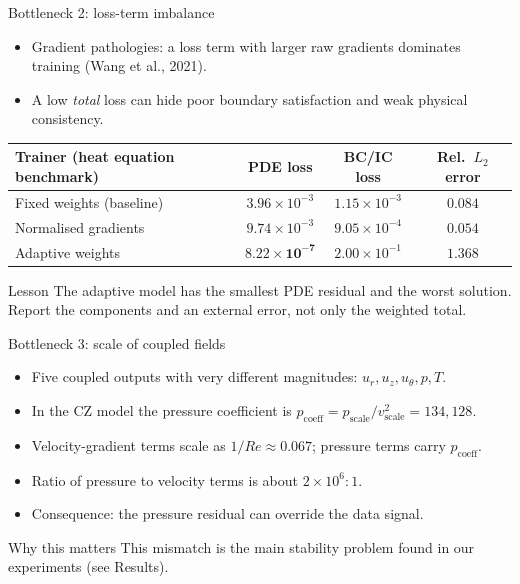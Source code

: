 \documentclass[aspectratio=169]{beamer}
\begin{document}
\begin{frame}{Bottleneck 2: loss-term imbalance}
\begin{itemize}
  \item Gradient pathologies: a loss term with larger raw gradients dominates training (Wang et al., 2021).
  \item A low \emph{total} loss can hide poor boundary satisfaction and weak physical consistency.
\end{itemize}
\vspace{0.2cm}
\begin{center}
\small
\begin{tabular}{lccc}
\toprule
Trainer (heat equation benchmark) & PDE loss & BC/IC loss & Rel.\ $L_2$ error \\
\midrule
Fixed weights (baseline) & $3.96\times10^{-3}$ & $1.15\times10^{-3}$ & $0.084$ \\
Normalised gradients & $9.74\times10^{-3}$ & $9.05\times10^{-4}$ & $0.054$ \\
Adaptive weights & $\mathbf{8.22\times10^{-7}}$ & $2.00\times10^{-1}$ & $\mathbf{1.368}$ \\
\bottomrule
\end{tabular}
\end{center}
\vspace{0.2cm}
\begin{block}{Lesson}
The adaptive model has the smallest PDE residual and the worst solution. Report the components and an external error, not only the weighted total.
\end{block}
\end{frame}

\begin{frame}{Bottleneck 3: scale of coupled fields}
\begin{itemize}
  \item Five coupled outputs with very different magnitudes: $u_r, u_z, u_\theta, p, T$.
  \item In the CZ model the pressure coefficient is $p_{\mathrm{coeff}} = p_{\mathrm{scale}}/v_{\mathrm{scale}}^2 = 134{,}128$.
  \item Velocity-gradient terms scale as $1/Re \approx 0.067$; pressure terms carry $p_{\mathrm{coeff}}$.
  \item Ratio of pressure to velocity terms is about $2\times10^{6}\!:\!1$.
  \item Consequence: the pressure residual can override the data signal.
\end{itemize}
\vspace{0.3cm}
\begin{alertblock}{Why this matters}
This mismatch is the main stability problem found in our experiments (see Results).
\end{alertblock}
\end{frame}
\end{document}

